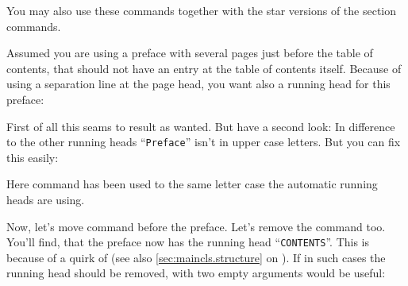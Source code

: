 You may also use these commands together with the star versions of the section
commands.%
%
\begin{Example}
  Assumed you are using a preface with several pages just before the table of
  contents, that should not have an entry at the table of contents
  itself. Because of using a separation line at the page head, you want also a
  running head for this preface:
  First of all this seams to result as wanted. But have a second look: In
  difference to the other running heads ``\texttt{Preface}'' isn't in upper
  case letters. But you can fix this easily:
  Here command  has been used to the same letter case the
  automatic running heads are using.

  Now, let's move command  before the preface. Let's
  remove the  command too. You'll find, that the preface now
  has the running head ``\texttt{CONTENTS}''. This is because of a quirk of
   (see also  \autoref{sec:maincls.structure} on
  ). If in such cases the running head
  should be removed,  with two empty arguments would be
  useful:
\end{Example}
%
%
%
%


